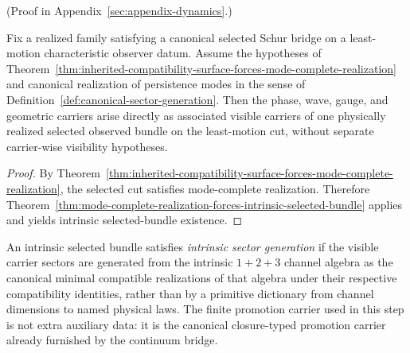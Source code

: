 (Proof in Appendix~\ref{sec:appendix-dynamics}.)

\begin{corollary}
\label{cor:compatibility-surface-forces-intrinsic-selected-bundle}
Fix a realized family satisfying a canonical selected Schur bridge on a
least-motion characteristic observer datum. Assume the hypotheses of
Theorem~\ref{thm:inherited-compatibility-surface-forces-mode-complete-realization}
and canonical realization of persistence modes in the sense of
Definition~\ref{def:canonical-sector-generation}. Then the phase, wave, gauge,
and geometric carriers arise directly as associated visible carriers of one
physically realized selected observed bundle on the least-motion cut, without
separate carrier-wise visibility hypotheses.
\end{corollary}

\begin{proof}
By
Theorem~\ref{thm:inherited-compatibility-surface-forces-mode-complete-realization},
the selected cut satisfies mode-complete realization.
Therefore
Theorem~\ref{thm:mode-complete-realization-forces-intrinsic-selected-bundle}
applies and yields intrinsic selected-bundle existence.
\end{proof}

\begin{definition}
\label{def:intrinsic-sector-generation}
An intrinsic selected bundle satisfies \emph{intrinsic sector generation} if
the visible carrier sectors are generated from the intrinsic \(1+2+3\) channel
algebra as the canonical minimal compatible realizations of that algebra under
their respective compatibility identities, rather than by a primitive
dictionary from channel dimensions to named physical laws. The finite promotion
carrier used in this step is not extra auxiliary data: it is the canonical
closure-typed promotion carrier already furnished by the continuum
bridge.
\end{definition}

